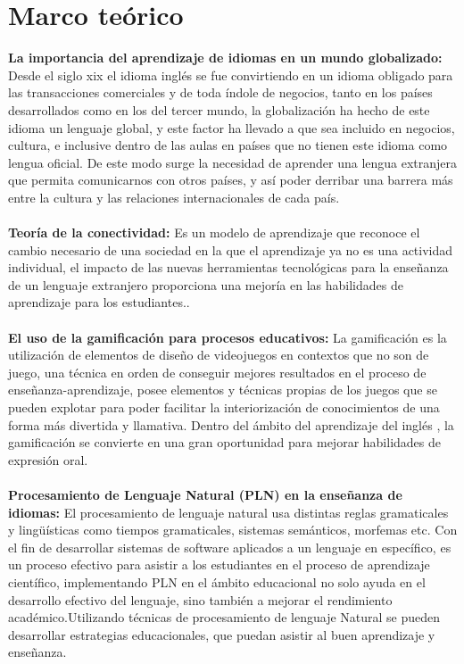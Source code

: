 
\section{Marco teórico}

\textbf{La importancia del aprendizaje de idiomas en un mundo globalizado: }Desde el siglo xix el idioma inglés se fue convirtiendo en un idioma obligado para las transacciones comerciales y de toda índole de negocios, tanto en los países desarrollados como en los del tercer mundo,  la globalización ha hecho de este idioma un lenguaje global, y este factor ha llevado a que sea incluido en negocios, cultura, e inclusive dentro de las aulas en países que no tienen este idioma \cite{ibm_pln} como lengua oficial. De este modo surge la necesidad de aprender una lengua extranjera que permita comunicarnos con otros países, y así poder derribar una barrera más entre la cultura y las relaciones internacionales de cada país.
\\
\\
\textbf{Teoría de la conectividad: }Es un modelo de aprendizaje que reconoce el cambio necesario de una sociedad en la que el aprendizaje ya no es una actividad individual, el impacto de las nuevas herramientas tecnológicas para la enseñanza de un lenguaje extranjero proporciona una mejoría en las habilidades de aprendizaje para los estudiantes.\cite{martinez2020herramientas}.
\\
\\
\textbf{El uso de la gamificación para procesos educativos: }La gamificación es la utilización de elementos de diseño de videojuegos en contextos que no son de juego, una técnica en orden de conseguir mejores resultados en el proceso de enseñanza-aprendizaje, posee elementos y técnicas propias de los juegos que se pueden explotar para poder facilitar la interiorización de conocimientos de una forma más divertida y llamativa. Dentro del ámbito del aprendizaje del inglés \cite{molina2021gamificacion}, la gamificación se convierte en una gran oportunidad para mejorar habilidades de expresión oral.
\\
\\
\textbf{Procesamiento de Lenguaje Natural (PLN) en la enseñanza de idiomas: }El procesamiento de lenguaje natural usa distintas reglas gramaticales y lingüísticas como tiempos gramaticales, sistemas semánticos, morfemas etc. Con el fin de desarrollar sistemas de software aplicados a un lenguaje en específico, es un proceso efectivo para asistir a los estudiantes en el proceso de aprendizaje científico, implementando \cite{alhawiti2014natural} PLN en el ámbito educacional no solo ayuda en el desarrollo efectivo del lenguaje, sino también a mejorar el rendimiento académico.Utilizando técnicas de procesamiento de lenguaje Natural se pueden desarrollar estrategias educacionales, que puedan asistir al buen aprendizaje y enseñanza.
\vfill
